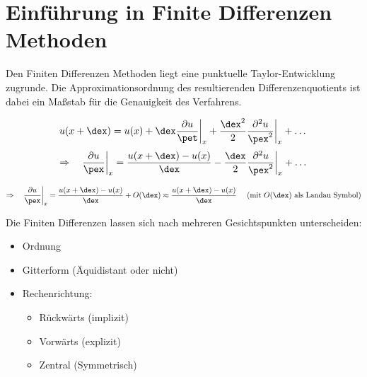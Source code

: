 \section{Einf\"uhrung in Finite Differenzen Methoden}
Den Finiten Differenzen Methoden liegt eine punktuelle Taylor-Entwicklung zugrunde. Die Approximationsordnung des resultierenden Differenzenquotients ist dabei ein Ma\ss{}stab f\"ur die Genauigkeit des Verfahrens.

\begin{equation}
	u(x+\dex) = u(x) + \dex\frac{\partial u}{\pet}\bigg|_{x} + \frac{\dex^2}{2}\frac{\partial^2 u}{\pex^2}\bigg|_x + \dots
\end{equation}
\begin{equation}
	\Rightarrow ~~~ \frac{\partial u}{\pex}\bigg|_x = \frac{u(x + \dex ) - u(x)}{\dex} - \frac{\dex}{2}\frac{\partial^2 u}{\pex^2}\bigg|_x + \dots
\end{equation}

\vspace{-1.6em}

\begin{equation}
	\Rightarrow ~~~ \frac{\partial u}{\pex}\bigg|_x = \frac{u(x + \dex ) - u(x)}{\dex} + O(\dex) \approx \frac{u(x + \dex ) - u(x)}{\dex} ~~~~ (\textrm{mit } O(\dex ) \textrm{ als Landau Symbol})
\end{equation}

\vspace{-2.5em}

Die Finiten Differenzen lassen sich nach mehreren Gesichtspunkten unterscheiden: 
\begin{itemize}
	\item Ordnung 
	\item Gitterform (\"Aquidistant oder nicht)
	\item Rechenrichtung:
	\begin{itemize}
		\item R\"uckw\"arts (implizit)
		\item Vorw\"arts (explizit)
		\item Zentral (Symmetrisch)
	\end{itemize}
\end{itemize}

